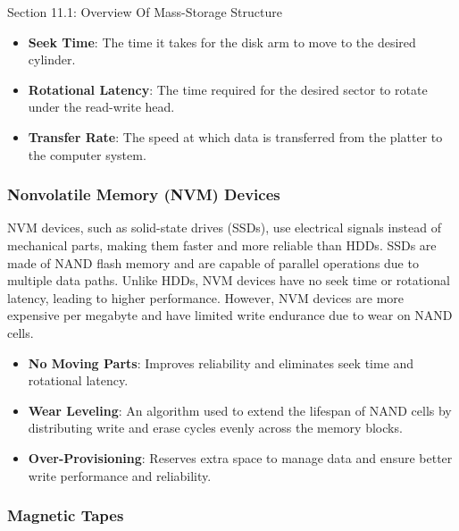 \begin{notes}{Section 11.1: Overview Of Mass-Storage Structure}
\begin{highlight}
        \begin{itemize}
            \item \textbf{Seek Time}: The time it takes for the disk arm to move to the desired cylinder.
            \item \textbf{Rotational Latency}: The time required for the desired sector to rotate under the read-write head.
            \item \textbf{Transfer Rate}: The speed at which data is transferred from the platter to the computer system.
        \end{itemize}
    
    \end{highlight}

    \subsubsection*{Nonvolatile Memory (NVM) Devices}
    
    NVM devices, such as solid-state drives (SSDs), use electrical signals instead of mechanical parts, making them faster and more reliable than HDDs. SSDs are made of NAND flash memory and are 
    capable of parallel operations due to multiple data paths. Unlike HDDs, NVM devices have no seek time or rotational latency, leading to higher performance. However, NVM devices are more expensive 
    per megabyte and have limited write endurance due to wear on NAND cells.
    
    \begin{highlight}
    
        \begin{itemize}
            \item \textbf{No Moving Parts}: Improves reliability and eliminates seek time and rotational latency.
            \item \textbf{Wear Leveling}: An algorithm used to extend the lifespan of NAND cells by distributing write and erase cycles evenly across the memory blocks.
            \item \textbf{Over-Provisioning}: Reserves extra space to manage data and ensure better write performance and reliability.
        \end{itemize}
    
    \end{highlight}

    \subsubsection*{Magnetic Tapes}
    

\end{notes}
